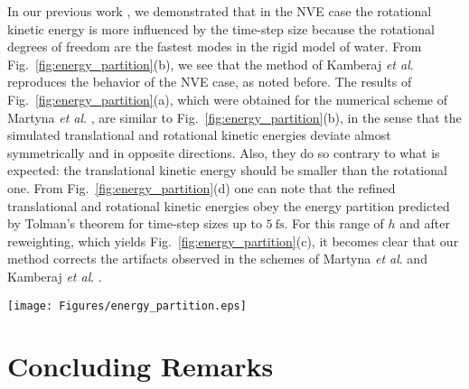 \documentclass[
	aip,
	jcp,
	reprint,
]{revtex4-1}
\newcommand{\timestep}{h}
\begin{document}
In our previous work \cite{Silveira_2017}, we demonstrated that in the NVE case the rotational kinetic energy is more influenced by the time-step size because the rotational degrees of freedom are the fastest modes in the rigid model of water. 
From Fig.~\ref{fig:energy_partition}(b), we see that the method of Kamberaj \textit{et al}. \cite{Kamberaj_2005} reproduces the behavior of the NVE case, as noted before.
The results of Fig.~\ref{fig:energy_partition}(a), which were obtained for the numerical scheme of Martyna \textit{et al}. \cite{Martyna_1996}, are similar to Fig.~\ref{fig:energy_partition}(b), in the sense that the simulated translational and rotational kinetic energies deviate almost symmetrically and in opposite directions.
Also, they do so contrary to what is expected: the translational kinetic energy should be smaller than the rotational one.
From Fig.~\ref{fig:energy_partition}(d) one can note that the refined translational and rotational kinetic energies obey the energy partition predicted by Tolman's theorem \cite{Tolman_1918} for time-step sizes up to $5~\text{fs}$.
For this range of $\timestep$ and after reweighting, which yields Fig.~\ref{fig:energy_partition}(c), it becomes clear that our method corrects the artifacts observed in the schemes of Martyna \textit{et al}. \cite{Martyna_1996} and Kamberaj \textit{et al}. \cite{Kamberaj_2005}.

\begin{figure*}
	\texttt{[image: Figures/energy\_partition.eps]}
		\caption{Influence of the time-step size on the kinetic energy partition in NVT MD simulations of 903 TIP3P\cite{Jorgensen_1983} water molecules for (a) our implementation of the numerical scheme by Martyna \textit{et al.} \cite{Martyna_1996} and (b) the method due to Kamberaj \textit{et al.} \cite{Kamberaj_2005}, as well as for (c) our refined version of the thermostat by Martyna \textit{et al.} \cite{Martyna_1996}, for which we also depict in (d) the results obtained without applying the reweighting procedure. For each case, we show the simulated translational (black down triangles) and rotational (black up triangles) kinetic energies, as well as the expected translational (green squares) and rotational (red x) values assuming equipartition.}
	\label{fig:energy_partition}
\end{figure*}

\section{Concluding Remarks}
\label{sec:conclusion}
\end{document}
